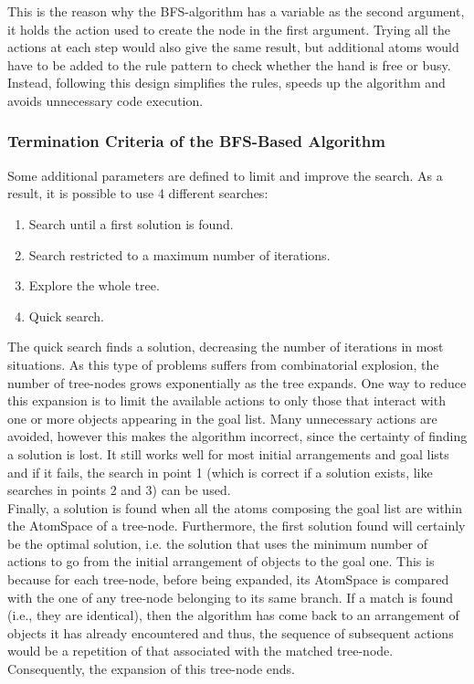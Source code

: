 This is the reason why the BFS-algorithm has a variable as the second argument, it holds the action used to create the node in the first argument. 
Trying all the actions at each step would also give the same result, but additional atoms would have to be added to the rule pattern to check whether the hand is free or busy.
Instead, following this design simplifies the rules, speeds up the algorithm and avoids unnecessary code execution.


\subsubsection{Termination Criteria of the BFS-Based Algorithm}\label{sec:term_criteria}

Some additional parameters are defined to limit and improve the search. As a result, it is possible to use 4 different searches:

\begin{enumerate}
	\item Search until a first solution is found.
	\item Search restricted to a maximum number of iterations.
	\item Explore the whole tree.
	\item Quick search.
\end{enumerate}

The quick search finds a solution, decreasing the number of iterations in most situations.
As this type of problems suffers from combinatorial explosion\footnotemark{}, the number of tree-nodes grows exponentially as the tree expands.
One way to reduce this expansion is to limit the available actions to only those that interact with one or more objects appearing in the goal list.
Many unnecessary actions are avoided, however this makes the algorithm incorrect, since the certainty of finding a solution is lost.
It still works well for most initial arrangements and goal lists and if it fails, the search in point 1 (which is correct if a solution exists, like searches in points 2 and 3) can be used. \\

Finally, a solution is found when all the atoms composing the goal list are within the AtomSpace of a tree-node. 
Furthermore, the first solution found will certainly be the optimal solution, i.e. the solution that uses the minimum number of actions to go from the initial arrangement of objects to the goal one.
This is because for each tree-node, before being expanded, its AtomSpace is compared with the one of any tree-node belonging to its same branch.
If a match is found (i.e., they are identical), then the algorithm has come back to an arrangement of objects it has already encountered and thus, the sequence of subsequent actions would be a repetition of that associated with the matched tree-node. Consequently, the expansion of this tree-node ends.


